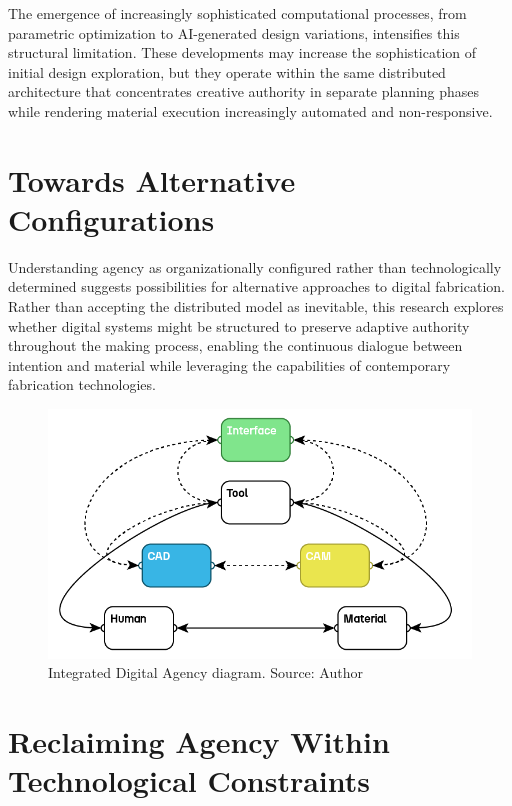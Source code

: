 \vspace{0.5cm}

The emergence of increasingly sophisticated computational processes, from parametric optimization to AI-generated design variations, intensifies this structural limitation. These developments may increase the sophistication of initial design exploration, but they operate within the same distributed architecture that concentrates creative authority in separate planning phases while rendering material execution increasingly automated and non-responsive.

\section{Towards Alternative Configurations}

Understanding agency as organizationally configured rather than technologically determined suggests possibilities for alternative approaches to digital fabrication. Rather than accepting the distributed model as inevitable, this research explores whether digital systems might be structured to preserve adaptive authority throughout the making process, enabling the continuous dialogue between intention and material while leveraging the capabilities of contemporary fabrication technologies.

\begin{figure}[H]
\centering
\includegraphics[width=1\textwidth]{figures/chapter1/Integrated Digital Agency.png}
\caption{Integrated Digital Agency diagram. Source: Author}
\label{fig:integrated_digital_agency}
\end{figure}

\section{Reclaiming Agency Within Technological Constraints}

